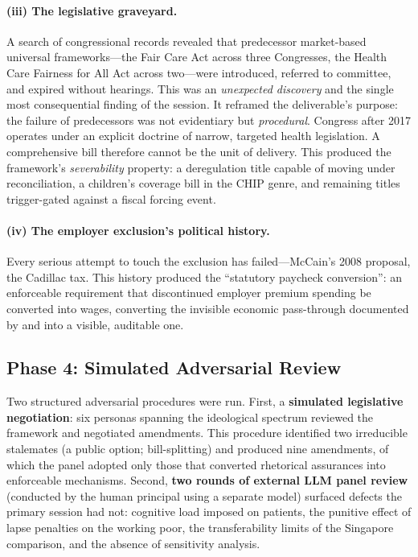 \documentclass[11pt,a4paper]{article}
\begin{document}
\paragraph{(iii) The legislative graveyard.} A search of congressional records revealed that predecessor market-based universal frameworks---the Fair Care Act across three Congresses, the Health Care Fairness for All Act across two---were introduced, referred to committee, and expired without hearings. This was an \emph{unexpected discovery} and the single most consequential finding of the session. It reframed the deliverable's purpose: the failure of predecessors was not evidentiary but \emph{procedural}. Congress after 2017 operates under an explicit doctrine of narrow, targeted health legislation. A comprehensive bill therefore cannot be the unit of delivery. This produced the framework's \emph{severability} property: a deregulation title capable of moving under reconciliation, a children's coverage bill in the CHIP genre, and remaining titles trigger-gated against a fiscal forcing event.

\paragraph{(iv) The employer exclusion's political history.} Every serious attempt to touch the exclusion has failed---McCain's 2008 proposal, the Cadillac tax. This history produced the ``statutory paycheck conversion'': an enforceable requirement that discontinued employer premium spending be converted into wages, converting the invisible economic pass-through documented by \citet{summers1989} and \citet{gruber1994} into a visible, auditable one.

\subsection{Phase 4: Simulated Adversarial Review}

Two structured adversarial procedures were run. First, a \textbf{simulated legislative negotiation}: six personas spanning the ideological spectrum reviewed the framework and negotiated amendments. This procedure identified two irreducible stalemates (a public option; bill-splitting) and produced nine amendments, of which the panel adopted only those that converted rhetorical assurances into enforceable mechanisms. Second, \textbf{two rounds of external LLM panel review} (conducted by the human principal using a separate model) surfaced defects the primary session had not: cognitive load imposed on patients, the punitive effect of lapse penalties on the working poor, the transferability limits of the Singapore comparison, and the absence of sensitivity analysis.
\end{document}
